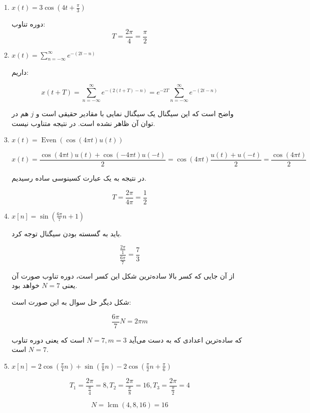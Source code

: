 \documentclass[12pt]{article}
\begin{document}
\begin{enumerate}[label = \harfi*)]
	
	\item
	
	$
	x(t)=3 \cos \left(4 t+\frac{\pi}{3}\right)
	$
	
	دوره تناوب:
	$$T= \frac{2\pi}{4} = \frac{\pi}{2}$$
	
	
	\item
	$x(t) = \sum_{n=-\infty}^{\infty} e^{-(2t -n)}$
	
	داریم:
	
	$$x(t+T) = \sum_{n=-\infty}^{\infty} e^{-(2(t+T) -n)} = e^{-2T}\sum_{n=-\infty}^{\infty} e^{-(2t -n)}$$
	
	واضح است که این سیگنال یک سیگنال نمایی با مقادیر حقیقی است و $j$ هم در توان آن ظاهر نشده است. در نتیجه متناوب نیست.
	
	
	\item
	
	$x(t) = \operatorname{Even} (\cos(4\pi t) u(t))$
	
	$$x(t) = 
	\frac{\cos (4 \pi t) u(t)+\cos (-4 \pi t) u(-t)}{2}
	= \cos(4\pi t)\frac{u(t) + u(-t)}{2} = \frac{\cos(4\pi t)}{2} $$

در نتیجه به یک عبارت کسینوسی ساده رسیدیم.

$$T = \frac{2 \pi}{4 \pi} = \frac{1}{2}$$	
	
	
	\item
	$x[n] = \sin(\frac{6\pi}{7} n +1)$
	
	باید به گسسته بودن سیگنال توجه کرد.
	
	$$\frac{\frac{2\pi}{1}}{\frac{6 \pi}{7}} = \frac{7}{3}$$
	
	از آن جایی که کسر بالا ساده‌ترین شکل این کسر است، دوره تناوب صورت آن یعنی $N=7$ خواهد بود.
	
	شکل دیگر حل سوال به این صورت است:
	
	$$\frac{6 \pi}{7} N = 2\pi m$$
	
	که ساده‌ترین اعدادی که به دست‌ می‌آید $N=7 , m =3$ است که یعنی دوره تناوب $N=7$ است.
	
	\item
	$x[n] = 2 \cos(\frac{\pi}{4} n) + \sin(\frac{\pi}{8} n) - 2 \cos(\frac{\pi}{2} n + \frac{\pi}{6})$
	
	$$T_1 = \frac{2\pi}{\frac{\pi}{4}} = 8 , T_2 = \frac{2\pi}{\frac{\pi}{8}} = 16 , T_3 = \frac{2\pi}{\frac{\pi}{2}} = 4 $$
	
	$$N = \operatorname{lcm}(4,8,16) = 16$$
\end{enumerate}
\end{document}
